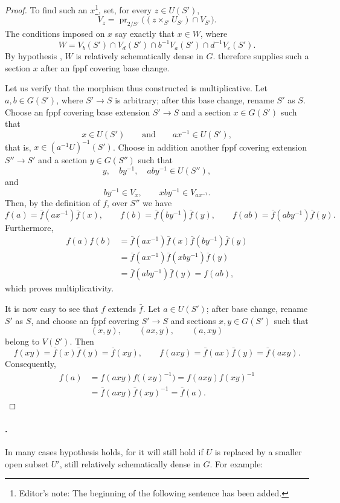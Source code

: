 \begin{proof}
To find such an \(x\)\footnote{Editor's note: The beginning of the
following sentence has been added.}, set, for every \(z\in U(S')\),
\[
  V_z=
  \operatorname{pr}_{2/S'}
  \bigl((z\times_{S'}U_{S'})\cap V_{S'}\bigr).
\]
The conditions imposed on \(x\) say exactly that \(x\in W\), where
\[
  W=
  V_b(S')\cap V_d(S')\cap
  b^{-1}V_a(S')\cap d^{-1}V_c(S').
\]
By hypothesis \textup{}, \(W\) is relatively schematically
dense in \(G\).  therefore supplies such a section
\(x\) after an fppf covering base change.

Let us verify that the morphism thus constructed is multiplicative.
Let \(a,b\in G(S')\), where \(S'\to S\) is arbitrary; after this
base change, rename \(S'\) as \(S\). Choose an fppf covering base
extension \(S'\to S\) and a section \(x\in G(S')\) such that
\[
  x\in U(S')
  \qquad\text{and}\qquad
  ax^{-1}\in U(S'),
\]
that is, \(x\in(a^{-1}U)^{-1}(S')\). Choose in addition another
fppf covering extension \(S''\to S'\) and a section
\(y\in G(S'')\) such that
\[
  y,\quad by^{-1},\quad aby^{-1}\in U(S''),
\]
and
\[
  by^{-1}\in V_x,
  \qquad
  xby^{-1}\in V_{ax^{-1}}.
\]
Then, by the definition of \(f\), over \(S''\) we have
\[
  f(a)=\bar f(ax^{-1})\bar f(x),\qquad
  f(b)=\bar f(by^{-1})\bar f(y),\qquad
  f(ab)=\bar f(aby^{-1})\bar f(y).
\]
Furthermore,
\[
\begin{aligned}
  f(a)f(b)
    &=\bar f(ax^{-1})\bar f(x)\bar f(by^{-1})\bar f(y)\\
    &=\bar f(ax^{-1})\bar f(xby^{-1})\bar f(y)\\
    &=\bar f(aby^{-1})\bar f(y)
     =f(ab),
\end{aligned}
\]
which proves multiplicativity.

It is now easy to see that \(f\) extends \(\bar f\). Let
\(a\in U(S')\); after base change, rename \(S'\) as \(S\), and choose
an fppf covering \(S'\to S\) and sections \(x,y\in G(S')\) such that
\[
  (x,y),\qquad (ax,y),\qquad (a,xy)
\]
belong to \(V(S')\). Then
\[
  f(xy)=\bar f(x)\bar f(y)=\bar f(xy),
  \qquad
  f(axy)=\bar f(ax)\bar f(y)=\bar f(axy).
\]
Consequently,
\[
\begin{aligned}
  f(a)
    &=f(axy)f\bigl((xy)^{-1}\bigr)
     =f(axy)f(xy)^{-1}\\
    &=\bar f(axy)\bar f(xy)^{-1}
     =\bar f(a).
\end{aligned}
\]
\end{proof}

\paragraph{.}
In many cases hypothesis \textup{} holds, for it will still
hold if \(U\) is replaced by a smaller open subset \(U'\), still
relatively schematically dense in \(G\). For example:

